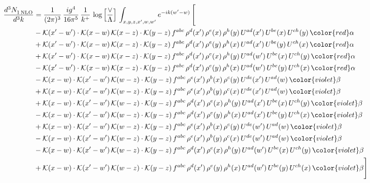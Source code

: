 \begin{align}
  \frac{d^{3}N_{1\,\rm NLO}^{\rm}}{d^{3}k}  & = \frac{1}{(2\pi)^{3}}\, \frac{ig^{4}}{16\pi^{5}}\, \frac{1}{k^{+}}\, \log{\left[\frac{\vee}{\Lambda}\right]}\, \int_{x,y,z,x^{\prime},w,w^{\prime}}e^{-ik(w^{\prime}-w)}\, \Bigg[\notag \\ & -\mathcal{K}(x'-w')\cdot\mathcal{K}(x-w)\,\mathcal{K}(x-z)\cdot\mathcal{K}(y-z)\, f^{abc}\,\rho^{d}(x')\,\rho^{e}(x)\,\rho^{h}(y)\,U^{ad}(x')\,U^{be}(x)\,U^{ch}(y)\,{\color{red}\alpha}\notag\\
&+\mathcal{K}(x'-w')\cdot\mathcal{K}(x-w)\,\mathcal{K}(x-z)\cdot\mathcal{K}(y-z)\, f^{abc}\,\rho^{d}(x')\,\rho^{e}(y)\,\rho^{h}(x)\,U^{ad}(x')\,U^{be}(y)\,U^{ch}(x)\,{\color{red}\alpha}\notag\\ & +\mathcal{K}(x'-w')\cdot\mathcal{K}(x-w)\,\mathcal{K}(x-z)\cdot\mathcal{K}(y-z)\, f^{abc}\,\rho^{d}(x')\,\rho^{e}(x)\,\rho^{h}(y)\,U^{ad}(w')\,U^{be}(x)\,U^{ch}(y)\,{\color{red}\alpha}\notag\\ & -\mathcal{K}(x'-w')\cdot\mathcal{K}(x-w)\,\mathcal{K}(x-z)\cdot\mathcal{K}(y-z)\, f^{abc}\,\rho^{d}(x')\,\rho^{e}(y)\,\rho^{h}(x)\,U^{ad}(w')\,U^{be}(y)\,U^{ch}(x)\,{\color{red}\alpha}\notag\\ & - \mathcal{K}(x-w) \cdot \mathcal{K}(x'-w')\, \mathcal{K}(w-z)\cdot \mathcal{K}(y-z)\, f^{abc}\, \rho^{e}(x')\,\rho^{b}(x)\,\rho^{c}(y)\,U^{de}(x')\,U^{ad}(w)\,{\color{violet} \beta} \notag \\ &  +  \mathcal{K}(x-w) \cdot \mathcal{K}(x'-w')\, \mathcal{K}(w-z)\cdot \mathcal{K}(y-z)\, f^{abc}\, \rho^{e}(x')\,\rho^{b}(y)\,\rho^{c}(x)\,U^{de}(x')\,U^{ad}(w)\,{\color{violet} \beta} \notag \\ & + \mathcal{K}(x-w) \cdot \mathcal{K}(x'-w')\, \mathcal{K}(w-z)\cdot \mathcal{K}(y-z)\, f^{abc}\, \rho^{d}(x')\,\rho^{e}(x)\,\rho^{h}(y)\,U^{ad}(x')\,U^{be}(x)\,U^{ch}(y)\, {\color{violet} \beta} \notag \\ & - \mathcal{K}(x-w) \cdot \mathcal{K}(x'-w')\, \mathcal{K}(w-z)\cdot \mathcal{K}(y-z)\, f^{abc}\, \rho^{d}(x')\,\rho^{e}(y)\,\rho^{h}(x)\,U^{ad}(x')\,U^{be}(y)\,U^{ch}(x)\, {\color{violet} \beta} \notag \\ & + \mathcal{K}(x-w) \cdot \mathcal{K}(x'-w')\, \mathcal{K}(w-z)\cdot \mathcal{K}(y-z)\, f^{abc}\, \rho^{e}(x')\,\rho^{b}(x)\,\rho^{c}(y)\,U^{de}(w')\,U^{ad}(w)\,{\color{violet} \beta} \notag \\ & - \mathcal{K}(x-w) \cdot \mathcal{K}(x'-w')\, \mathcal{K}(w-z)\cdot \mathcal{K}(y-z)\, f^{abc}\, \rho^{e}(x')\,\rho^{b}(y)\,\rho^{c}(x)\,U^{de}(w')\,U^{ad}(w)\, {\color{violet} \beta} \notag \\ & - \mathcal{K}(x-w) \cdot \mathcal{K}(x'-w')\, \mathcal{K}(w-z)\cdot \mathcal{K}(y-z)\, f^{abc}\, \rho^{d}(x')\,\rho^{e}(x)\,\rho^{h}(y)\,U^{ad}(w')\,U^{be}(x)\,U^{ch}(y)\, {\color{violet} \beta} \notag \\ & + \mathcal{K}(x-w) \cdot \mathcal{K}(x'-w')\, \mathcal{K}(w-z)\cdot \mathcal{K}(y-z)\, f^{abc}\, \rho^{d}(x')\,\rho^{e}(y)\,\rho^{h}(x)\,U^{ad}(w')\,U^{be}(y)\,U^{ch}(x)\, {\color{violet} \beta} \Bigg]
\end{align}
